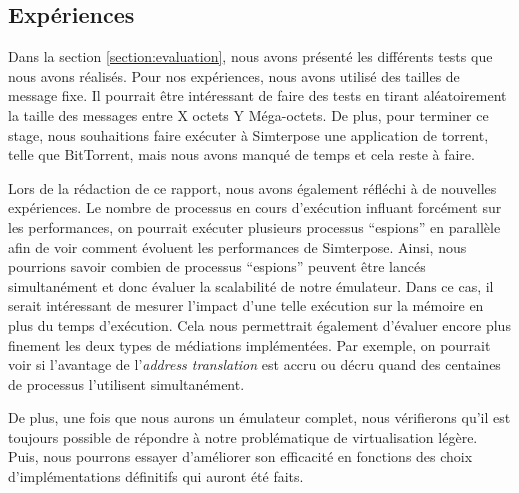 \subsection{Expériences}
Dans la section \ref{section:evaluation}, nous avons présenté les différents tests que nous avons réalisés. Pour nos expériences, nous avons utilisé des tailles de message fixe. Il pourrait être intéressant de faire des tests en tirant aléatoirement la taille des messages entre X octets Y Méga-octets. De plus, pour terminer ce stage, nous souhaitions faire exécuter à Simterpose une application de torrent, telle que BitTorrent, mais nous avons manqué de temps et cela reste à faire.

Lors de la rédaction de ce rapport, nous avons également réfléchi à de nouvelles expériences. Le nombre de processus en cours d'exécution influant forcément sur les performances, on pourrait exécuter plusieurs processus ``espions'' en parallèle afin de voir comment évoluent les performances de Simterpose. Ainsi, nous pourrions savoir  combien de processus ``espions'' peuvent être lancés simultanément et donc évaluer la scalabilité de notre émulateur. Dans ce cas, il serait intéressant de mesurer l'impact d'une telle exécution sur la mémoire en plus du temps d'exécution. Cela nous permettrait également d'évaluer encore plus finement les deux types de médiations implémentées. Par exemple, on pourrait voir si l'avantage de l'\textit{address translation} est accru ou décru quand des centaines de processus l'utilisent simultanément.

De plus, une fois que nous aurons un émulateur complet, nous vérifierons qu'il est toujours possible de répondre à notre problématique de virtualisation légère. Puis, nous pourrons essayer d'améliorer son efficacité en fonctions des choix d'implémentations définitifs qui auront été faits.


